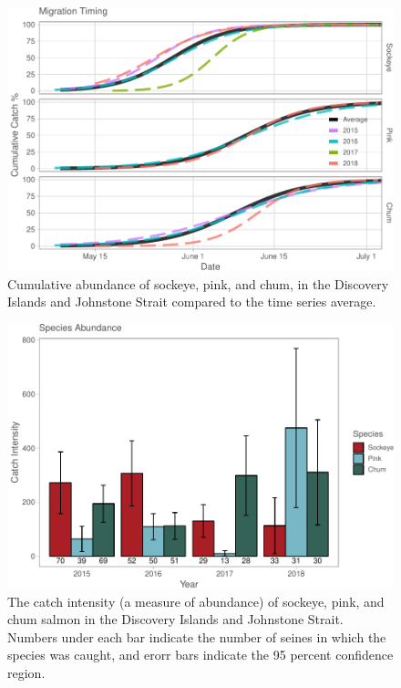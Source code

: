 \documentclass[fleqn,10pt]{wlpeerj} %
\begin{document}
\begin{figure}[H]
\includegraphics[width=0.9\linewidth]{Migration_Observations_Report_files/figure-latex/migration-timing-plot-1} \caption{Cumulative abundance of sockeye, pink, and chum, in the Discovery Islands and Johnstone Strait compared to the time series average.}\label{fig:migration-timing-plot}
\end{figure}

\begin{figure}[H]
\includegraphics[width=0.9\linewidth]{Migration_Observations_Report_files/figure-latex/catch-intensity-plot-1} \caption{The catch intensity (a measure of abundance) of sockeye, pink, and chum salmon in the Discovery Islands and Johnstone Strait. Numbers under each bar indicate the number of seines in which the species was caught, and erorr bars indicate the 95 percent confidence region.}\label{fig:catch-intensity-plot}
\end{figure}
\end{document}
